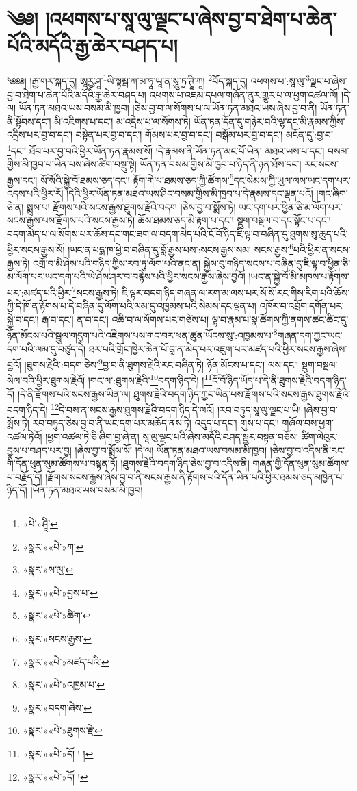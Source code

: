 \chapter{༄༅། །འཕགས་པ་སཱ་ལུ་ལྗང་པ་ཞེས་བྱ་བ་ཐེག་པ་ཆེན་པོའི་མདོའི་རྒྱ་ཆེར་བཤད་པ།}༄༅༅། །རྒྱ་གར་སྐད་དུ། ཨཱརྱ་ཤཱ་\footnote{«པེ་»ཤཱི་}ལི་སྟམྦ་ཀ་མ་ཧཱ་ཡཱ་ན་སཱུ་ཏྲ་ཊཱི་ཀཱ། \footnote{«སྣར་»«པེ་»ཀ་}བོད་སྐད་དུ། འཕགས་པ་:སཱ་ལུ་\footnote{«སྣར་»ས་ལུ་}ལྗང་པ་ཞེས་བྱ་བ་ཐེག་པ་ཆེན་པོའི་མདོའི་རྒྱ་ཆེར་བཤད་པ། འཕགས་པ་འཇམ་དཔལ་གཞོན་ནུར་གྱུར་པ་ལ་ཕྱག་འཚལ་ལོ། །དེ་ལ། ཡོན་ཏན་མཐའ་ཡས་བསམ་མི་ཁྱབ། །ཅེས་བྱ་བ་ལ་སོགས་པ་ལ་ཡོན་ཏན་མཐའ་ཡས་ཞེས་བྱ་བ་ནི། ཡོན་ཏན་ནི་སྟོབས་དང་། མི་འཇིགས་པ་དང་། མ་འདྲེས་པ་ལ་སོགས་ཏེ། ཡོན་ཏན་དོན་དུ་གཉེར་བའི་ལྷ་དང་མི་རྣམས་ཀྱིས་འདྲིས་པར་བྱ་བ་དང་། བསྟེན་པར་བྱ་བ་དང་། གོམས་པར་བྱ་བ་དང་། བསྒོམ་པར་བྱ་བ་དང་། མངོན་དུ་:བྱ་བ་\footnote{«སྣར་»«པེ་»བྱས་པ་}དང་། ཐོབ་པར་བྱ་བའི་ཕྱིར་ཡོན་ཏན་རྣམས་སོ། །དེ་རྣམས་ནི་ཡོན་ཏན་མང་པོ་ཡིན། མཐའ་ཡས་པ་དང་། བསམ་གྱིས་མི་ཁྱབ་པ་ཡིན་པས་ཞེས་ཚིག་བསྡུ་སྟེ། ཡོན་ཏན་བསམ་གྱིས་མི་ཁྱབ་པ་ཉིད་ནི་ཉན་ཐོས་དང་། རང་སངས་རྒྱས་དང་། སོ་སོའི་སྐྱེ་བོ་ཐམས་ཅད་དང་། རྟོག་གེ་པ་ཐམས་ཅད་ཀྱི་ཚོགས་\footnote{«སྣར་»«པེ་»ཚིག་}དང་སེམས་ཀྱི་ཡུལ་ལས་ཡང་དག་པར་འདས་པའི་ཕྱིར་རོ། །དེའི་ཕྱིར་ཡོན་ཏན་མཐའ་ཡས་ཤིང་བསམ་གྱིས་མི་ཁྱབ་པ་དེ་རྣམས་དང་ལྡན་པའོ། །གང་ཞིག་ཅེ་ན། སྨྲས་པ། རྫོགས་པའི་སངས་རྒྱས་ཐུགས་རྗེའི་བདག །ཅེས་བྱ་བ་སྨོས་ཏེ། ཡང་དག་པར་ཕྱིན་ཅི་མ་ལོག་པར་སངས་རྒྱས་པས་རྫོགས་པའི་སངས་རྒྱས་ཏེ། ཆོས་ཐམས་ཅད་མི་རྟག་པ་དང་། སྡུག་བསྔལ་བ་དང་སྟོང་པ་དང་། བདག་མེད་པ་ལ་སོགས་པར་ཆོས་དང་གང་ཟག་ལ་བདག་མེད་པའི་ངོ་བོ་ཉིད་ཇི་ལྟ་བ་བཞིན་དུ་ཐུགས་སུ་ཆུད་པའི་ཕྱིར་སངས་རྒྱས་སོ། །ཡང་ན་པདྨ་ཁ་ཕྱེ་བ་བཞིན་དུ་བློ་རྒྱས་པས་:སངས་རྒྱས་སམ། སངས་རྒྱས་\footnote{«སྣར་»སངས་རྒྱས་}པའི་ཕྱིར་ན་སངས་རྒྱས་ཏེ། འགྲོ་བ་མི་ཤེས་པའི་གཉིད་ཀྱིས་རབ་ཏུ་ལོག་པའི་ནང་ན། སྐྱེས་བུ་གཉིད་སངས་པ་བཞིན་དུ་ཇི་ལྟ་བ་ཕྱིན་ཅི་མ་ལོག་པར་ཡང་དག་པའི་ཡེ་ཤེས་ཤར་བ་བརྙེས་པའི་ཕྱིར་སངས་རྒྱས་ཞེས་བྱའོ། །ཡང་ན་སྐྱེ་བོ་མི་མཁས་པ་རྟོགས་པར་:མཛད་པའི་ཕྱིར་\footnote{«སྣར་»«པེ་»མཛད་པའི་}སངས་རྒྱས་ཏེ། ཇི་ལྟར་བདག་ཉིད་གཞན་ལ་རག་མ་ལས་པར་སོ་སོ་རང་གིས་རིག་པའི་ཆོས་ཀྱི་དེ་ཁོ་ན་རྟོགས་པ་དེ་བཞིན་དུ་ལོག་པའི་ལམ་དུ་འཁྱམས་པའི་སེམས་དང་ལྡན་པ། འཁོར་བ་འབྲོག་དགོན་པར་སྐྱེ་བ་དང་། རྒ་བ་དང་། ན་བ་དང་། འཆི་བ་ལ་སོགས་པར་གཙེས་པ། ལྟ་བ་རྣམ་པ་སྣ་ཚོགས་ཀྱི་ནགས་ཚང་ཚིང་དུ་ཉོན་མོངས་པའི་སྦྲུལ་གདུག་པའི་འཇིགས་པས་གང་བར་ཕན་ཚུན་ཡོངས་སུ་:འཁྱམས་པ་\footnote{«སྣར་»«པེ་»འཁྱམ་པ་}གཞན་དག་ཀྱང་ཡང་དག་པའི་ལམ་དུ་བཙུད་དེ། ཐར་པའི་གྲོང་ཁྱེར་ཆེན་པོ་བླ་ན་མེད་པར་འཇུག་པར་མཛད་པའི་ཕྱིར་སངས་རྒྱས་ཞེས་བྱའོ། །ཐུགས་རྗེའི་:བདག་ཅེས་\footnote{«སྣར་»བདག་ཞེས་}བྱ་བ་ནི་ཐུགས་རྗེའི་རང་བཞིན་ཏེ། ཉོན་མོངས་པ་དང་། ལས་དང་། སྡུག་བསྔལ་སེལ་བའི་ཕྱིར་ཐུགས་རྗེའོ། །གང་ལ་:ཐུགས་རྗེའི་\footnote{«སྣར་»«པེ་»ཐུགས་རྗེ་}བདག་ཉིད་དེ། །\footnote{«སྣར་»«པེ་»དོ། ། །}ངོ་བོ་ཉིད་ཡོད་པ་དེ་ནི་ཐུགས་རྗེའི་བདག་ཉིད་དོ། །དེ་ནི་རྫོགས་པའི་སངས་རྒྱས་ཡིན་ལ། ཐུགས་རྗེའི་བདག་ཉིད་ཀྱང་ཡིན་པས་རྫོགས་པའི་སངས་རྒྱས་ཐུགས་རྗེའི་བདག་ཉིད་དེ། \footnote{«སྣར་»«པེ་»དོ། ། }དེ་བས་ན་སངས་རྒྱས་ཐུགས་རྗེའི་བདག་ཉིད་དེ་ལའོ། །རབ་བཏུད་སཱ་ལུ་ལྗང་པ་ཡི། །ཞེས་བྱ་བ་སྨོས་ཏེ། རབ་བཏུད་ཅེས་བྱ་བ་ནི་ཡང་དག་པར་མཆོད་ནས་ཏེ། འདུད་པ་དང་། གུས་པ་དང་། གཞོལ་བས་ཕྱག་འཚལ་ཏེའོ། །ཕྱག་འཚལ་ཏེ་ཅི་ཞིག་བྱ་ཞེ་ན། སཱ་ལུ་ལྗང་པའི་ཞེས་མདོའི་བཤད་སྦྱར་བསྟན་བཅོས། ཚིག་ལེའུར་བྱས་པ་བཤད་པར་བྱ། །ཞེས་བྱ་བ་སྨོས་སོ། །དེ་ལ། ཡོན་ཏན་མཐའ་ཡས་བསམ་མི་ཁྱབ། །ཅེས་བྱ་བ་འདིས་ནི་རང་གི་དོན་ཕུན་སུམ་ཚོགས་པ་བསྟན་ཏོ། །ཐུགས་རྗེའི་བདག་ཉིད་ཅེས་བྱ་བ་འདིས་ནི། གཞན་གྱི་དོན་ཕུན་སུམ་ཚོགས་པ་བརྗོད་དོ། །རྫོགས་སངས་རྒྱས་ཞེས་བྱ་བ་ནི་སངས་རྒྱས་ནི་རྟོགས་པའི་དོན་ཡིན་པའི་ཕྱིར་ཐམས་ཅད་མཁྱེན་པ་ཉིད་དོ། །ཡོན་ཏན་མཐའ་ཡས་བསམ་མི་ཁྱབ། 